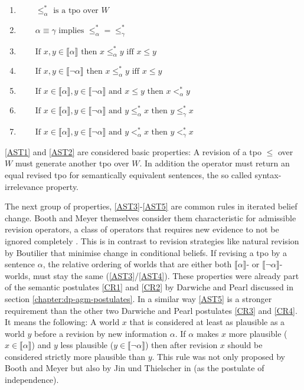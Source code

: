 \documentclass[english, 12pt]{scrartcl}
\theoremstyle{definition}
\theoremstyle{definition}
\theoremstyle{definition}
\newcommand{\modelsOf}[1]{\llbracket #1 \rrbracket}
\begin{document}
\begin{enumerate}[wide=0pt, widest=99,leftmargin=\parindent,label = ($\ast\arabic*$)]
    \item\label{AST1} $\qquad \leq_{\alpha}^{\ast} \textrm{ is a tpo over } W$
    \item\label{AST2} $\qquad\alpha \equiv \gamma \textrm{ implies } \leq_{\alpha}^{\ast}=\leq_{\gamma}^{\ast}$
    \item\label{AST3} $\qquad \textrm{If } x, y \in \modelsOf{\alpha} \textrm{ then } x \leq_{\alpha}^{\ast} y \textrm{ iff } x \leq y$
    \item\label{AST4} $\qquad \textrm{If } x, y \in \modelsOf{\neg\alpha} \textrm{ then } x \leq_{\alpha}^{\ast} y \textrm{ iff } x \leq y$
    \item\label{AST5} $\qquad \textrm{If } x \in \modelsOf{\alpha}, y \in \modelsOf{\neg\alpha} \textrm{ and } x \leq y \textrm{ then } x <_{\alpha}^{\ast} y$
    \item\label{AST6} $\qquad \textrm{If } x \in \modelsOf{\alpha}, y \in \modelsOf{\neg\alpha} \textrm{ and } y \leq_{\alpha}^{\ast} x \textrm{ then } y \leq_{\gamma}^{\ast} x$
    \item\label{AST7} $\qquad \textrm{If } x \in \modelsOf{\alpha}, y \in \modelsOf{\neg\alpha} \textrm{ and } y <_{\alpha}^{\ast} x \textrm{ then } y <_{\gamma}^{\ast} x$
\end{enumerate}

\ref{AST1} and \ref{AST2} are considered basic properties: A revision of a tpo $\leq$ over $W$ must generate another tpo over $W$. In addition the operator must return an equal revised tpo for semantically equivalent sentences, the so called syntax-irrelevance property.

The next group of properties, \ref{AST3}-\ref{AST5} are common rules in iterated belief change. Booth and Meyer themselves consider them characteristic for admissible revision operators, a class of operators that requires new evidence to not be ignored completely \cite{Booth2006a}. This is in contrast to revision strategies like natural revision by Boutilier \cite{Boutilier1996} that minimise change in conditional beliefs.
If revising a tpo by a sentence $\alpha$, the relative ordering of worlds that are either both $\modelsOf{\alpha}$- or $\modelsOf{\neg\alpha}$-worlds, must stay the same (\ref{AST3}/\ref{AST4}). These properties were already part of the semantic postulates \ref{CR1} and \ref{CR2} by Darwiche and Pearl \cite{Darwiche1997} discussed in section \ref{chapter:dp-agm-postulates}.
In a similar way \ref{AST5} is a stronger requirement than the other two Darwiche and Pearl postulates \ref{CR3} and \ref{CR4}. It means the following: A world $x$ that is considered at least as plausible as a world $y$ before a revision by new information $\alpha$. If $\alpha$ makes $x$ more plausible ($x \in \modelsOf{\alpha}$) and $y$ less plausible ($y \in \modelsOf{\neg\alpha}$) then after revision $x$ should be considered strictly more plausible than $y$. This rule was not only proposed by Booth and Meyer \cite{Booth2006a} but also by Jin und Thielscher in \cite{Jin2007} (as the postulate of independence).
\end{document}

